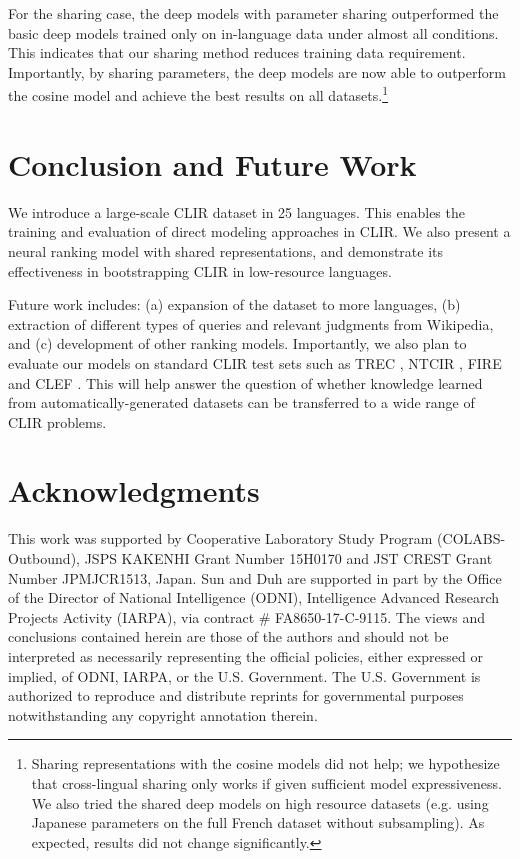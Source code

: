\documentclass[11pt,a4paper]{article}
\begin{document}
For the sharing case, the deep models with parameter sharing outperformed the basic deep models trained only on in-language data under almost all conditions. 
This indicates that our sharing method reduces training data requirement. 
Importantly, by sharing parameters, the deep models are now able to outperform the cosine model and achieve the best results on all datasets.\footnote{Sharing representations with the cosine models did not help; we hypothesize that cross-lingual sharing only works if given sufficient model expressiveness. We also tried the shared deep models on high resource datasets (e.g. using Japanese parameters on the full French dataset without subsampling). As expected, results did not change significantly.}

\section{Conclusion and Future Work}
We introduce a large-scale CLIR dataset in 25 languages.
This enables the training and evaluation of direct modeling approaches in CLIR. 
We also present a neural ranking model with shared representations, and demonstrate its effectiveness in bootstrapping CLIR in low-resource languages. 

Future work includes: (a) expansion of the dataset to more languages, (b) extraction of different types of queries and relevant judgments from Wikipedia, and (c) development of other ranking models. 
Importantly, we also plan to evaluate our models on standard CLIR test sets such as TREC \cite{schauble97trec}, NTCIR \citeyearpar{ntcir}, FIRE \citeyearpar{fire} and CLEF \citeyearpar{clef}. 
This will help answer the question of whether knowledge learned from automatically-generated datasets can be transferred to a wide range of CLIR problems.

\section*{Acknowledgments}
This work was supported by Cooperative Laboratory Study Program (COLABS-Outbound), JSPS KAKENHI Grant Number 15H0170 and JST CREST Grant Number JPMJCR1513, Japan.
Sun and Duh are supported in part by the Office of the Director of National Intelligence (ODNI), Intelligence Advanced Research Projects Activity (IARPA), via contract \# FA8650-17-C-9115. The views and conclusions contained herein are those of the authors and should not be interpreted as necessarily representing the official policies, either expressed or implied, of ODNI, IARPA, or the U.S. Government. The U.S. Government is authorized to reproduce and distribute reprints for governmental purposes notwithstanding any copyright annotation therein.

%
%



\end{document}
